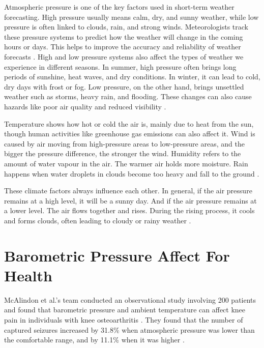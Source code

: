 \documentclass[11pt]{article}
\begin{document}
Atmospheric pressure is one of the key factors used in short-term weather forecasting. High pressure usually means calm, dry, and sunny weather, while low pressure is often linked to clouds, rain, and strong winds. Meteorologists track these pressure systems to predict how the weather will change in the coming hours or days. This helps to improve the accuracy and reliability of weather forecasts \cite{yonekura2018short} \cite{metoffice_highlow}. High and low pressure systems also affect the types of weather we experience in different seasons. In summer, high pressure often brings long periods of sunshine, heat waves, and dry conditions. In winter, it can lead to cold, dry days with frost or fog. Low pressure, on the other hand, brings unsettled weather such as storms, heavy rain, and flooding. These changes can also cause hazards like poor air quality and reduced visibility \cite{ucar_pressure}.

Temperature shows how hot or cold the air is, mainly due to heat from the sun, though human activities like greenhouse gas emissions can also affect it. Wind is caused by air moving from high-pressure areas to low-pressure areas, and the bigger the pressure difference, the stronger the wind. Humidity refers to the amount of water vapour in the air. The warmer air holds more moisture. Rain happens when water droplets in clouds become too heavy and fall to the ground \cite{metoffice_conditions} \cite{ncas_weather}.

These climate factors always influence each other. In general, if the air pressure remains at a high level, it will be a sunny day. And if the air pressure remains at a lower level. The air flows together and rises. During the rising process, it cools and forms clouds, often leading to cloudy or rainy weather \cite{mcalindon2006barometric}.


\section{Barometric Pressure Affect For Health}

McAlindon et al.'s team conducted an observational study involving 200 patients and found that barometric pressure and ambient temperature can affect knee pain in individuals with knee osteoarthritis \cite{izadyar2021effect}. They found that the number of captured seizures increased by 31.8\% when atmospheric pressure was lower than the comfortable range, and by 11.1\% when it was higher \cite{horvath2023pain}.
\end{document}
